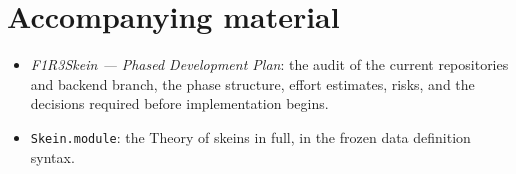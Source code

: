 \documentclass[11pt,a4paper]{article}
\theoremstyle{definition}
\theoremstyle{plain}
\begin{document}
\section*{Accompanying material}

\begin{itemize}
\item \emph{F1R3Skein --- Phased Development Plan}: the audit of the current repositories and
backend branch, the phase structure, effort estimates, risks, and the decisions required before
implementation begins.
\item \texttt{Skein.module}: the Theory of skeins in full, in the frozen data definition syntax.
\end{itemize}
\end{document}
